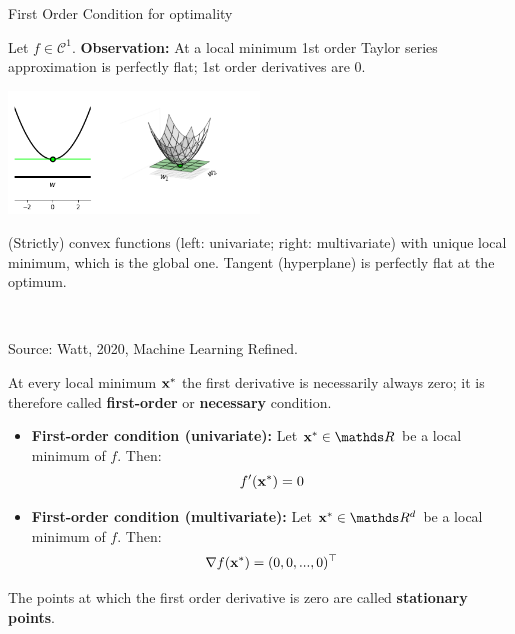 \documentclass[11pt,compress,t,notes=noshow, xcolor=table]{beamer}
\begin{document}
  \begin{vbframe}{First Order Condition for optimality}
  
  Let $f \in \mathcal{C}^1$. \textbf{Observation: } At a local minimum 1st order Taylor series approximation is perfectly flat; 1st order derivatives are $0$.

  \lz 
  
  \begin{center}
  \includegraphics[width = 0.5\textwidth]{figure_man/first_order.png} \\
  \begin{footnotesize}
  (Strictly) convex functions (left: univariate; right: multivariate) with unique local minimum, which is the global one. Tangent (hyperplane) is perfectly flat at the optimum. \end{footnotesize}\\
  \begin{tiny}
  Source: Watt, 2020, Machine Learning Refined. 
  \end{tiny}
  \end{center}
  
  \framebreak 
  
  At every local minimum $\mathbf{x}^\ast$ the first derivative is necessarily always zero; it is therefore called \textbf{first-order} or \textbf{necessary} condition. 
  
  \lz 

  \begin{itemize}
    \item \textbf{First-order condition (univariate): } Let $\xv^\ast \in \R$ be a local minimum of $f$. Then:
    $$
    f'(\mathbf{x}^\ast) = 0
    $$
    \item \textbf{First-order condition (multivariate): } Let $\xv^\ast \in \R^d$ be a local minimum of $f$. Then:
    $$
    \nabla f(\mathbf{x}^\ast) = (0, 0, ..., 0)^\top
    $$
  
  \end{itemize}
  
  The points at which the first order derivative is zero are called \textbf{stationary points}. 
  
  \framebreak 
  

\end{vbframe}
\end{document}

